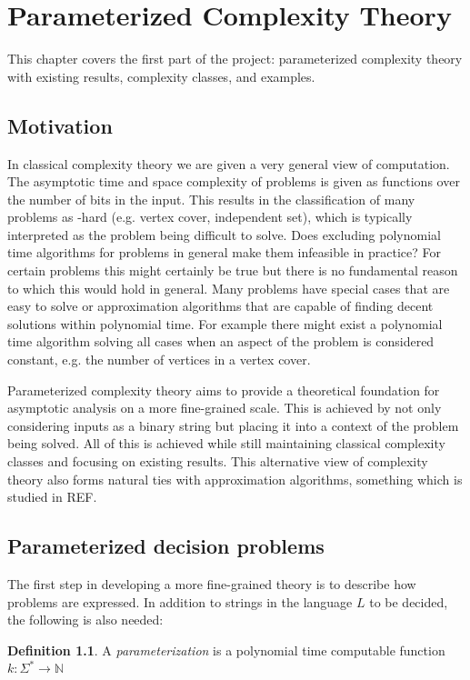\documentclass[a4paper,11pt]{report}
\theoremstyle{plain}
\theoremstyle{definition}
\newtheorem{defn}[thm]{Definition} %
\begin{document}
\chapter{Parameterized Complexity Theory}
This chapter covers the first part of the project: parameterized complexity theory with existing results, complexity classes, and examples.

\section{Motivation}
In classical complexity theory we are given a very general view of computation.
The asymptotic time and space complexity of problems is given as functions over the number of bits in the input.
This results in the classification of many problems as \NP-hard (e.g. vertex cover, independent set), which is typically interpreted as the problem being difficult to solve.
Does excluding polynomial time algorithms for problems in general make them infeasible in practice?
For certain problems this might certainly be true but there is no fundamental reason to which this would hold in general.
Many problems have special cases that are easy to solve or approximation algorithms that are capable of finding decent solutions within polynomial time.
For example there might exist a polynomial time algorithm solving all cases when an aspect of the problem is considered constant, e.g. the number of vertices in a vertex cover.

Parameterized complexity theory aims to provide a theoretical foundation for asymptotic analysis on a more fine-grained scale.
This is achieved by not only considering inputs as a binary string but placing it into a context of the problem being solved.
All of this is achieved while still maintaining classical complexity classes and focusing on existing results.
This alternative view of complexity theory also forms natural ties with approximation algorithms, something which is studied in REF.

\section{Parameterized decision problems}
The first step in developing a more fine-grained theory is to describe how problems are expressed.
In addition to strings in the language $L$ to be decided, the following is also needed:

\begin{defn}
A \emph{parameterization} is a polynomial time computable function $k : \Sigma^* \rightarrow \mathbb{N}$
\end{defn}
\end{document}
